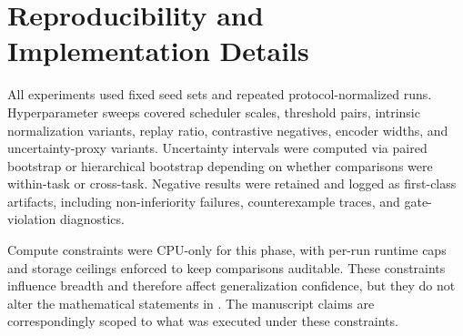 \documentclass{article} %
\begin{document}
\section{Reproducibility and Implementation Details}
\label{sec:appendix_repro}

All experiments used fixed seed sets and repeated protocol-normalized runs. Hyperparameter sweeps covered scheduler scales, threshold pairs, intrinsic normalization variants, replay ratio, contrastive negatives, encoder widths, and uncertainty-proxy variants. Uncertainty intervals were computed via paired bootstrap or hierarchical bootstrap depending on whether comparisons were within-task or cross-task. Negative results were retained and logged as first-class artifacts, including non-inferiority failures, counterexample traces, and gate-violation diagnostics.

Compute constraints were CPU-only for this phase, with per-run runtime caps and storage ceilings enforced to keep comparisons auditable. These constraints influence breadth and therefore affect generalization confidence, but they do not alter the mathematical statements in . The manuscript claims are correspondingly scoped to what was executed under these constraints.
\end{document}
